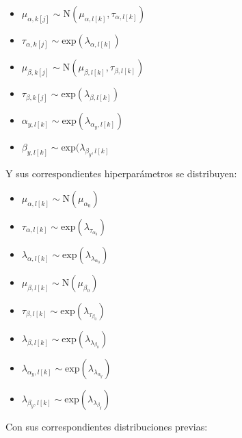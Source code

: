  \begin{multicols}{3}
    \begin{itemize}
		\item $\mu_{\alpha, k[j]} \sim \mathrm{N} (\mu_{\alpha, l[k]}, \tau_{\alpha, l[k]})$
		\item $\tau_{\alpha, k[j]} \sim \mathrm{exp} (\lambda_{\alpha, l[k]})$
		\item $\mu_{\beta, k[j]} \sim \mathrm{N} (\mu_{\beta, l[k]}, \tau_{\beta, l[k]})$
		\item $\tau_{\beta, k[j]} \sim \mathrm{exp} (\lambda_{\beta, l[k]})$
		\item $\alpha_{y, l[k]} \sim \mathrm{exp} (\lambda_{\alpha_y, l[k]})$	\item $\beta_{y, l[k]} \sim \mathrm{exp} (\lambda_{\beta_y, l[k]}$
    \end{itemize}
\end{multicols}


Y sus correspondientes hiperparámetros se distribuyen:

\begin{multicols}{3}
	\begin{itemize}

		\item $\mu_{\alpha, l[k]} \sim \mathrm{N}(\mu_{\alpha_0})$	
		\item $\tau_{\alpha, l[k]} \sim \mathrm{exp}(\lambda_{\tau_{\alpha_0}})$	
		\item $\lambda_{\alpha, l[k]} \sim \mathrm{exp}(\lambda_{\lambda_{\alpha_0}})$	
		\item $\mu_{\beta, l[k]} \sim \mathrm{N}(\mu_{\beta_0})$	
		\item $\tau_{\beta, l[k]} \sim \mathrm{exp}(\lambda_{\tau_{\beta_0}})$	
		\item $\lambda_{\beta, l[k]} \sim \mathrm{exp}(\lambda_{\lambda_{\beta_0}})$	
		\item $\lambda_{\alpha_y, l[k]} \sim \mathrm{exp}(\lambda_{\lambda_{\alpha_y}})$	
		\item $\lambda_{\beta_y, l[k]} \sim \mathrm{exp}(\lambda_{\lambda_{\beta_y}})$	

	\end{itemize}
\end{multicols}

Con sus correspondientes distribuciones previas:


